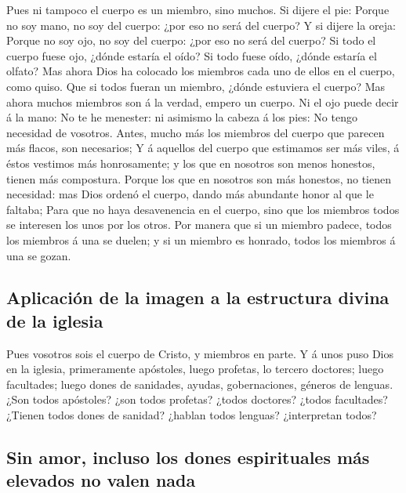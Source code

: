  Pues ni tampoco el cuerpo es un miembro, sino muchos.
 Si dijere el pie: Porque no soy mano, no soy del cuerpo:
¿por eso no será del cuerpo?  Y si dijere la oreja: Porque
no soy ojo, no soy del cuerpo: ¿por eso no será del cuerpo?
 Si todo el cuerpo fuese ojo, ¿dónde estaría el oído? Si
todo fuese oído, ¿dónde estaría el olfato?  Mas ahora Dios
ha colocado los miembros cada uno de ellos en el cuerpo, como quiso.
 Que si todos fueran un miembro, ¿dónde estuviera el
cuerpo?  Mas ahora muchos miembros son á la verdad, empero
un cuerpo.  Ni el ojo puede decir á la mano: No te he
menester: ni asimismo la cabeza á los pies: No tengo necesidad de
vosotros.  Antes, mucho más los miembros del cuerpo que
parecen más flacos, son necesarios;  Y á aquellos del
cuerpo que estimamos ser más viles, á éstos vestimos más honrosamente; y
los que en nosotros son menos honestos, tienen más compostura.
 Porque los que en nosotros son más honestos, no tienen
necesidad: mas Dios ordenó el cuerpo, dando más abundante honor al que
le faltaba;  Para que no haya desavenencia en el cuerpo,
sino que los miembros todos se interesen los unos por los otros.
 Por manera que si un miembro padece, todos los miembros á
una se duelen; y si un miembro es honrado, todos los miembros á una se
gozan.

\hypertarget{aplicaciuxf3n-de-la-imagen-a-la-estructura-divina-de-la-iglesia}{%
\subsection{Aplicación de la imagen a la estructura divina de la
iglesia}\label{aplicaciuxf3n-de-la-imagen-a-la-estructura-divina-de-la-iglesia}}

 Pues vosotros sois el cuerpo de Cristo, y miembros en
parte.  Y á unos puso Dios en la iglesia, primeramente
apóstoles, luego profetas, lo tercero doctores; luego facultades; luego
dones de sanidades, ayudas, gobernaciones, géneros de lenguas.
 ¿Son todos apóstoles? ¿son todos profetas? ¿todos
doctores? ¿todos facultades?  ¿Tienen todos dones de
sanidad? ¿hablan todos lenguas? ¿interpretan todos?

\hypertarget{sin-amor-incluso-los-dones-espirituales-muxe1s-elevados-no-valen-nada}{%
\subsection{Sin amor, incluso los dones espirituales más elevados no
valen
nada}\label{sin-amor-incluso-los-dones-espirituales-muxe1s-elevados-no-valen-nada}}

